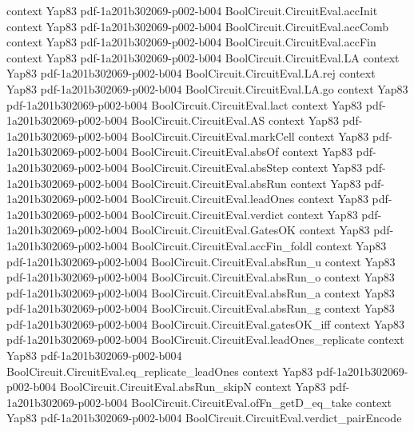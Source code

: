 \begin{theorem}
  {context}
  {Yap83}
  {pdf-1a201b302069-p002-b004}
\proofstep
  {BoolCircuit.CircuitEval.accInit}
  {context}
  {Yap83}
  {pdf-1a201b302069-p002-b004}
\proofstep
  {BoolCircuit.CircuitEval.accComb}
  {context}
  {Yap83}
  {pdf-1a201b302069-p002-b004}
\proofstep
  {BoolCircuit.CircuitEval.accFin}
  {context}
  {Yap83}
  {pdf-1a201b302069-p002-b004}
\proofstep
  {BoolCircuit.CircuitEval.LA}
  {context}
  {Yap83}
  {pdf-1a201b302069-p002-b004}
\proofstep
  {BoolCircuit.CircuitEval.LA.rej}
  {context}
  {Yap83}
  {pdf-1a201b302069-p002-b004}
\proofstep
  {BoolCircuit.CircuitEval.LA.go}
  {context}
  {Yap83}
  {pdf-1a201b302069-p002-b004}
\proofstep
  {BoolCircuit.CircuitEval.lact}
  {context}
  {Yap83}
  {pdf-1a201b302069-p002-b004}
\proofstep
  {BoolCircuit.CircuitEval.AS}
  {context}
  {Yap83}
  {pdf-1a201b302069-p002-b004}
\proofstep
  {BoolCircuit.CircuitEval.markCell}
  {context}
  {Yap83}
  {pdf-1a201b302069-p002-b004}
\proofstep
  {BoolCircuit.CircuitEval.absOf}
  {context}
  {Yap83}
  {pdf-1a201b302069-p002-b004}
\proofstep
  {BoolCircuit.CircuitEval.absStep}
  {context}
  {Yap83}
  {pdf-1a201b302069-p002-b004}
\proofstep
  {BoolCircuit.CircuitEval.absRun}
  {context}
  {Yap83}
  {pdf-1a201b302069-p002-b004}
\proofstep
  {BoolCircuit.CircuitEval.leadOnes}
  {context}
  {Yap83}
  {pdf-1a201b302069-p002-b004}
\proofstep
  {BoolCircuit.CircuitEval.verdict}
  {context}
  {Yap83}
  {pdf-1a201b302069-p002-b004}
\proofstep
  {BoolCircuit.CircuitEval.GatesOK}
  {context}
  {Yap83}
  {pdf-1a201b302069-p002-b004}
\proofstep
  {BoolCircuit.CircuitEval.accFin_foldl}
  {context}
  {Yap83}
  {pdf-1a201b302069-p002-b004}
\proofstep
  {BoolCircuit.CircuitEval.absRun_u}
  {context}
  {Yap83}
  {pdf-1a201b302069-p002-b004}
\proofstep
  {BoolCircuit.CircuitEval.absRun_o}
  {context}
  {Yap83}
  {pdf-1a201b302069-p002-b004}
\proofstep
  {BoolCircuit.CircuitEval.absRun_a}
  {context}
  {Yap83}
  {pdf-1a201b302069-p002-b004}
\proofstep
  {BoolCircuit.CircuitEval.absRun_g}
  {context}
  {Yap83}
  {pdf-1a201b302069-p002-b004}
\proofstep
  {BoolCircuit.CircuitEval.gatesOK_iff}
  {context}
  {Yap83}
  {pdf-1a201b302069-p002-b004}
\proofstep
  {BoolCircuit.CircuitEval.leadOnes_replicate}
  {context}
  {Yap83}
  {pdf-1a201b302069-p002-b004}
\proofstep
  {BoolCircuit.CircuitEval.eq_replicate_leadOnes}
  {context}
  {Yap83}
  {pdf-1a201b302069-p002-b004}
\proofstep
  {BoolCircuit.CircuitEval.absRun_skipN}
  {context}
  {Yap83}
  {pdf-1a201b302069-p002-b004}
\proofstep
  {BoolCircuit.CircuitEval.ofFn_getD_eq_take}
  {context}
  {Yap83}
  {pdf-1a201b302069-p002-b004}
\proofstep
  {BoolCircuit.CircuitEval.verdict_pairEncode}

\end{theorem}
